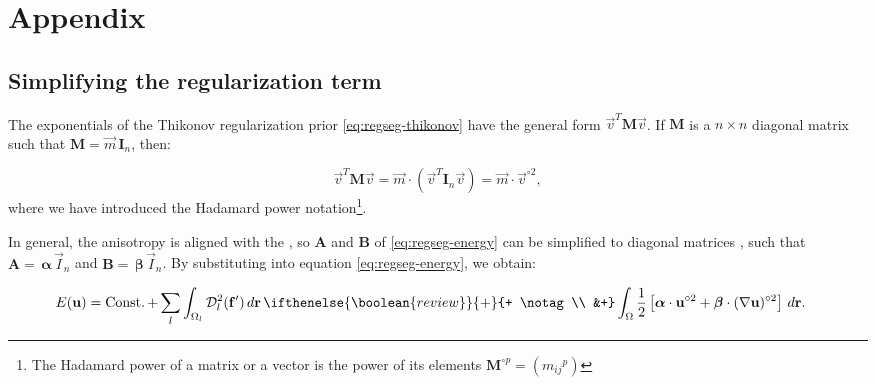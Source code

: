 \renewcommand{\theequation}{A.\arabic{equation}}
\renewcommand{\thesubsection}{Appendix \arabic{subsection}}

\section*{Appendix}

\subsection{Simplifying the regularization term}\label{app:reg_term}
The exponentials of the Thikonov regularization prior \eqref{eq:regseg-thikonov} have the general form
  $\vec{v}^T \mathbf{M} \vec{v}$.
If $\mathbf{M}$ is a $n \times n$ diagonal matrix such that $\mathbf{M} = \vec{m} \, \mathbf{I}_n$,
  then:

\begin{equation*}
\vec{v}^T \mathbf{M} \vec{v} = \vec{m} \cdot (\vec{v}^T \mathbf{I}_n \vec{v}) = \vec{m} \cdot \vec{v}^{\circ2},
\end{equation*}
  where we have introduced the Hadamard power notation\footnote{The Hadamard power of a matrix or a vector
  is the power of its elements $\mathbf{M}^{\circ p} = ({m_{ij}}^{p})$}.

In general, the anisotropy  is aligned with the 
  , so
  $\mathbf{A}$ and $\mathbf{B}$ of \eqref{eq:regseg-energy} can be simplified to diagonal matrices
  , such that
  $\mathbf{A}= \, \boldsymbol{\alpha}\,\vec{I}_n$ and
  $\mathbf{B}= \, \boldsymbol{\beta}\,\vec{I}_n$.
By substituting into equation \eqref{eq:regseg-energy}, we obtain:

  \begin{align}
  E(\vec{u}) &= \const + \, \underset{l}{\sum} \int_{\Omega_l} \mdist{f'}{l} \,d\vec{r} \,
  \ifthenelse{\boolean{review}}{+}{+ \notag\\ &+}
  \int_{\Omega} \frac12 \left[ \boldsymbol{\alpha} \cdot \vec{u}^{\circ2} + \boldsymbol{\beta} \cdot (\nabla \vec{u})^{\circ2} \right] \,d\vec{r}.
  \label{eq:regseg-app_energy}
  \end{align}

